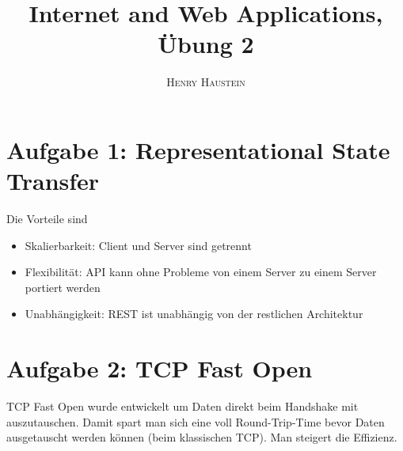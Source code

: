 \documentclass{article}
\title{\textbf{Internet and Web Applications, Übung 2}}
\author{\textsc{Henry Haustein}}
\date{}
\begin{document}
	\maketitle
	
	\section*{Aufgabe 1: Representational State Transfer}
	Die Vorteile sind
	\begin{itemize}
		\item Skalierbarkeit: Client und Server sind getrennt
		\item Flexibilität: API kann ohne Probleme von einem Server zu einem Server portiert werden
		\item Unabhängigkeit: REST ist unabhängig von der restlichen Architektur
	\end{itemize}

	\section*{Aufgabe 2: TCP Fast Open}
	TCP Fast Open wurde entwickelt um Daten direkt beim Handshake mit auszutauschen. Damit spart man sich eine voll Round-Trip-Time bevor Daten ausgetauscht werden können (beim klassischen TCP). Man steigert die Effizienz.
	
\end{document}
